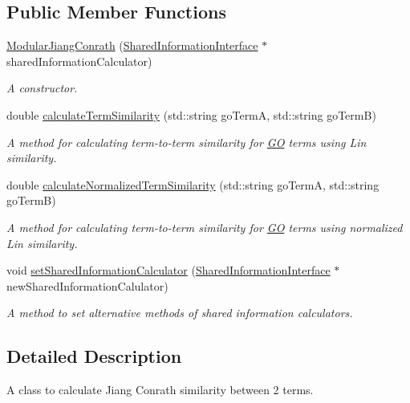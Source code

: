 \subsection*{Public Member Functions}
\begin{DoxyCompactItemize}
\item 
\hyperlink{classModularJiangConrath_aae432a48629db51d0f0d00a41d592b87}{Modular\+Jiang\+Conrath} (\hyperlink{classSharedInformationInterface}{Shared\+Information\+Interface} $\ast$shared\+Information\+Calculator)
\begin{DoxyCompactList}\small\item\em A constructor. \end{DoxyCompactList}\item 
double \hyperlink{classModularJiangConrath_a4bb41aa1eced9dd47f4f4c7125a223d5}{calculate\+Term\+Similarity} (std\+::string go\+TermA, std\+::string go\+TermB)
\begin{DoxyCompactList}\small\item\em A method for calculating term-\/to-\/term similarity for \hyperlink{namespaceGO}{GO} terms using Lin similarity. \end{DoxyCompactList}\item 
double \hyperlink{classModularJiangConrath_afbcb95c5f87764de5d33188948f1001b}{calculate\+Normalized\+Term\+Similarity} (std\+::string go\+TermA, std\+::string go\+TermB)
\begin{DoxyCompactList}\small\item\em A method for calculating term-\/to-\/term similarity for \hyperlink{namespaceGO}{GO} terms using normalized Lin similarity. \end{DoxyCompactList}\item 
void \hyperlink{classModularJiangConrath_a44a9dae983e696676cb41c8cf8f93cb6}{set\+Shared\+Information\+Calculator} (\hyperlink{classSharedInformationInterface}{Shared\+Information\+Interface} $\ast$new\+Shared\+Information\+Calulator)
\begin{DoxyCompactList}\small\item\em A method to set alternative methods of shared information calculators. \end{DoxyCompactList}\end{DoxyCompactItemize}


\subsection{Detailed Description}
A class to calculate Jiang Conrath similarity between 2 terms. 

